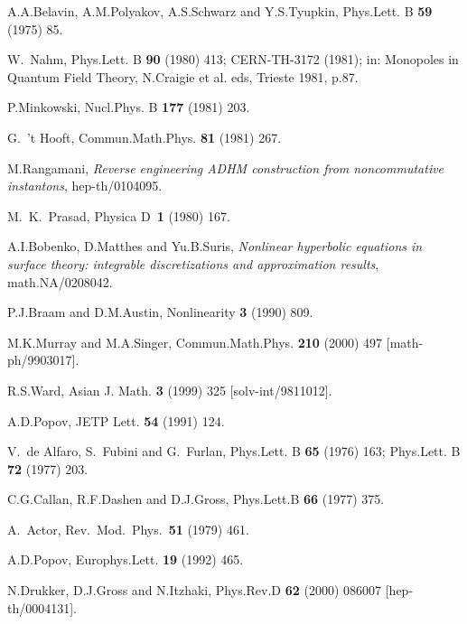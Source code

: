 \documentclass[a4paper,11pt]{article}
\numberwithin{equation}{section}
\begin{document}
\begin{thebibliography}{99}
A.A.Belavin, A.M.Polyakov, A.S.Schwarz and Y.S.Tyupkin,
Phys.Lett. B {\bf 59} (1975) 85.

W.~Nahm,
Phys.Lett. B {\bf 90} (1980) 413;
CERN-TH-3172 (1981);
in: Monopoles in Quantum Field Theory, N.Craigie et al. eds, Trieste 1981, p.87.

P.Minkowski,
Nucl.Phys. B {\bf 177} (1981) 203.

G.~'t Hooft,
Commun.Math.Phys. {\bf 81} (1981) 267.

M.Rangamani,
{\em Reverse engineering ADHM construction from noncommutative instantons},
hep-th/0104095.

M.~K.~Prasad,
Physica D~{\bf 1} (1980) 167.

A.I.Bobenko, D.Matthes and Yu.B.Suris, {\em Nonlinear hyperbolic equations 
in surface theory: integrable discretizations and approximation results},
math.NA/0208042.

P.J.Braam and D.M.Austin, Nonlinearity {\bf 3} (1990) 809.

M.K.Murray and M.A.Singer,
Commun.Math.Phys.  {\bf 210} (2000) 497
[math-ph/9903017].

 R.S.Ward, 
Asian J. Math. {\bf 3} (1999) 325 [solv-int/9811012].


A.D.Popov,
JETP Lett. {\bf 54} (1991) 124.

V.~de Alfaro, S.~Fubini and G.~Furlan,
Phys.Lett. B {\bf 65} (1976) 163;
Phys.Lett. B {\bf 72} (1977) 203.

C.G.Callan, R.F.Dashen and D.J.Gross,
Phys.Lett.B {\bf 66} (1977) 375.

A.~Actor,
Rev.\ Mod.\ Phys.\  {\bf 51} (1979) 461.

A.D.Popov,
Europhys.Lett. {\bf 19} (1992) 465.

N.Drukker, D.J.Gross and N.Itzhaki,
Phys.Rev.D {\bf 62} (2000) 086007
[hep-th/0004131].


\end{thebibliography}
\end{document}
